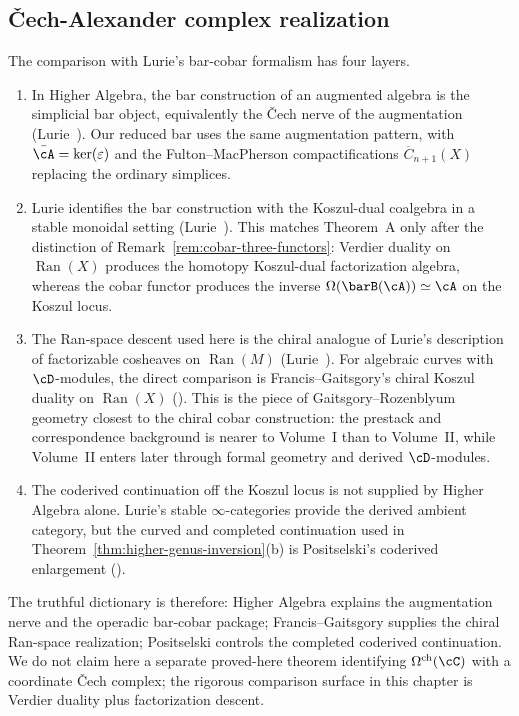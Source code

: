 \subsection{Čech-Alexander complex realization}

\begin{remark}\label{rem:v1-lurie-comparison-bar-cobar}
The comparison with Lurie's bar-cobar formalism has four layers.
\begin{enumerate}[label=\textup{(\roman*)}]
\item In Higher Algebra, the bar construction of an augmented algebra is the simplicial bar object, equivalently the \v{C}ech nerve of the augmentation
\textup{(}Lurie~\cite[Example~5.2.2.3, Proposition~5.2.2.5]{HA}\textup{)}.
Our reduced bar uses the same augmentation pattern, with
$\bar{\cA} = \ker(\varepsilon)$ and the Fulton--MacPherson
compactifications $\overline{C}_{n+1}(X)$ replacing the ordinary simplices.

\item Lurie identifies the bar construction with the Koszul-dual
coalgebra in a stable monoidal setting
\textup{(}Lurie~\cite[Proposition~5.2.5.1]{HA}\textup{)}.
This matches Theorem~A only after the distinction of
Remark~\ref{rem:cobar-three-functors}: Verdier duality on
$\operatorname{Ran}(X)$ produces the homotopy Koszul-dual
factorization algebra, whereas the cobar functor produces the inverse
$\Omega(\barB(\cA)) \simeq \cA$ on the Koszul locus.

\item The Ran-space descent used here is the chiral analogue of
Lurie's description of factorizable cosheaves on
$\operatorname{Ran}(M)$
\textup{(}Lurie~\cite[Theorems~5.5.4.10 and~5.5.4.14]{HA}\textup{)}.
For algebraic curves with $\cD$-modules, the direct comparison is
Francis--Gaitsgory's chiral Koszul duality on $\operatorname{Ran}(X)$
\textup{(}\cite[Remark~2.5.7, Theorem~5.1.1]{FG12}\textup{)}.
This is the piece of Gaitsgory--Rozenblyum geometry closest to
the chiral cobar construction: the prestack and correspondence background is
nearer to Volume~I than to Volume~II, while Volume~II enters later
through formal geometry and derived $\cD$-modules.

\item The coderived continuation off the Koszul locus is not supplied
by Higher Algebra alone. Lurie's stable $\infty$-categories provide
the derived ambient category, but the curved and completed
continuation used in
Theorem~\ref{thm:higher-genus-inversion}\textup{(}b\textup{)}
is Positselski's coderived enlargement
\textup{(}\cite{Positselski11}\textup{)}.
\end{enumerate}

\noindent
The truthful dictionary is therefore: Higher Algebra explains the
augmentation nerve and the operadic bar-cobar package; Francis--Gaitsgory
supplies the chiral Ran-space realization; Positselski controls the
completed coderived continuation. We do not claim here a separate
proved-here theorem identifying $\Omega^{\mathrm{ch}}(\cC)$ with a
coordinate \v{C}ech complex; the rigorous comparison surface in this
chapter is Verdier duality plus factorization descent.
\end{remark}

